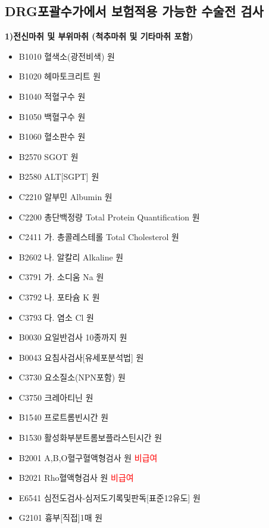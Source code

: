 \subsection{DRG포괄수가에서 보험적용 가능한 수술전 검사}
\myde{}
{
\textbf{1)전신마취 및 부위마취 (척추마취 및 기타마취 포함)}\par
\begin{itemize}\tightlist
\item[\dschemical] B1010 혈색소(광전비색)  원
\item[\dschemical] B1020 헤마토크리트  원
\item[\dschemical] B1040 적혈구수  원
\item[\dschemical] B1050 백혈구수  원
\item[\dschemical] B1060 혈소판수  원
\item[\dschemical] B2570 SGOT  원
\item[\dschemical] B2580 ALT[SGPT]  원
\item[\dschemical] C2210 알부민 Albumin  원
\item[\dschemical] C2200 총단백정량 Total Protein Quantification  원
\item[\dschemical] C2411 가. 총콜레스테롤 Total Cholesterol  원
\item[\dschemical] B2602 나. 알칼리 Alkaline  원
\item[\dschemical] C3791 가. 소디움 Na  원
\item[\dschemical] C3792 나. 포타슘 K  원
\item[\dschemical] C3793 다. 염소 Cl  원 
\item[\dschemical] B0030 요일반검사 10종까지  원
\item[\dschemical] B0043 요침사검사[유세포분석법]  원
\item[\dschemical] C3730 요소질소(NPN포함)  원
\item[\dschemical] C3750 크레아티닌  원
\item[\dschemical] B1540 프로트롬빈시간  원
\item[\dschemical] B1530 활성화부분트롬보플라스틴시간  원
\item[\dschemical] B2001 A,B,O혈구혈액형검사  원 \textcolor{red}{비급여}
\item[\dschemical] B2021 Rho혈액형검사  원 \textcolor{red}{비급여}
\item[\dschemical] E6541 심전도검사-심저도기록및판독[표준12유도]  원
\item[\dschemical] G2101 흉부[직접]1매  원
\end{itemize}

}
